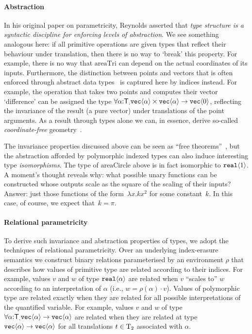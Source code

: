 \paragraph{Abstraction}
In his original paper on parametricity, Reynolds asserted that
\emph{type structure is a syntactic discipline for enforcing levels of
  abstraction}.  We see something analogous here: if all primitive
operations are given types that reflect their behaviour under
translation, then there is no way to `break' this property. For
example, there is no way that $\mathrm{areaTri}$ can depend on the
actual coordinates of its inputs. Furthermore, the distinction between
points and vectors that is often enforced through abstract data
types~\cite{CGAL} is captured here by indices instead. For example,
the operation that takes two points and computes their vector
`difference' can be assigned the type
$\forall\alpha\mathord:\mathsf{T}_.\textup{\texttt{vec}}\langle \alpha \rangle\times\textup{\texttt{vec}}\langle \alpha \rangle\to\textup{\texttt{vec}}\langle 0 \rangle$,
reflecting the invariance of the result (a pure vector) under
translations of the point arguments. As a result through types alone
we can, in essence, derive so-called \emph{coordinate-free}
geometry~\cite{CFGADT}.

The invariance properties discussed above can be seen as ``free
theorems''~\cite{wadler89theorems}, but the abstraction afforded by
polymorphic indexed types can also induce interesting type
\emph{isomorphisms}.  The type of $\mathrm{areaCircle}$ above is in
fact isomorphic to $\textup{\texttt{real}}\langle 1 \rangle$. A moment's thought reveals why:
what possible unary functions can be constructed whose outputs scale
as the square of the scaling of their inputs?  Answer: just those
functions of the form~$\lambda x. k x^2$ for some constant~$k$.  In
this case, of course, we expect that~$k = \pi$.

\paragraph{Relational parametricity}
To derive such invariance and abstraction properties of types, we
adopt the techniques of relational parametricity. Over an underlying
index-erasure semantics we construct binary relations parameterised by
an environment $\rho$ that describes how values of primitive type are
related according to their indices.  For example, values $v$ and $w$
of type $\textup{\texttt{real}}\langle \alpha \rangle$ are related when $v$ ``scales to'' $w$
according to an interpretation of $\alpha$ (i.e., $w=\rho(\alpha)\cdot
v$).  Values of polymorphic type are related exactly when they are
related for all possible interpretations of the quantified
variable. For example, values $v$ and $w$ of type
$\forall\alpha\mathord:\mathsf{T}_.\textup{\texttt{vec}}\langle \alpha \rangle\to
\textup{\texttt{vec}}\langle \alpha \rangle$ are related when they are related at type
$\textup{\texttt{vec}}\langle \alpha \rangle\to\textup{\texttt{vec}}\langle \alpha \rangle$ for all translations
$t\in\mathrm{T}_2$ associated with $\alpha$.

